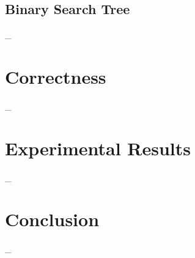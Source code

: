 \documentclass[10pt,conference,compsocconf]{IEEEtran}
\begin{document}
\subsection{Binary Search Tree}
\_

\section{Correctness}
\label{sec:correctness}
\_

\section{Experimental Results}
\label{sec:experiment}
\_

\section{Conclusion}
\label{sec:conclusion}
\_




\end{document}
